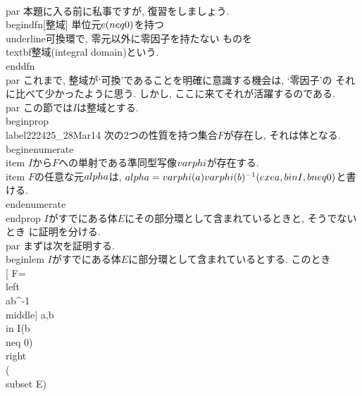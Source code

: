 \\par 本題に入る前に私事ですが, 復習をしましょう.
\\begin{dfn}[整域]
 単位元$e(\\neq0)$を持つ\\underline{可換環}で, 零元以外に零因子を持たない
 ものを
 \\textbf{整域(integral domain)}という.
\\end{dfn}
\\par これまで, 整域が`可換'であることを明確に意識する機会は, `零因子'の
それに比べて少かったように思う. しかし, ここに来てそれが活躍するのである.
\\par この節では$I$は整域とする.
\\begin{prop}
 \\label{222425_28Mar14}
 次の2つの性質を持つ集合$F$が存在し, それは体となる.
 \\begin{enumerate}
  \\item $I$から$F$への単射である準同型写像$\\varphi$が存在する.
  \\item $F$の任意な元$\\alpha$は, $\\alpha=\\varphi(a)\\varphi(b)^{-1}(\\exe
        a,b\\in I,b\\neq 0)$と書ける.
 \\end{enumerate}
\\end{prop}
$I$がすでにある体$E$にその部分環として含まれているときと, そうでないとき
に証明を分ける.
\\par まずは次を証明する.
\\begin{lem}
 $I$がすでにある体$E$に部分環として含まれているとする. このとき
 \\[
  F=\\left\\{ab^{-1}\\middle| a,b\\in I(b\\neq 0)\\right\\}(\\subset E)
